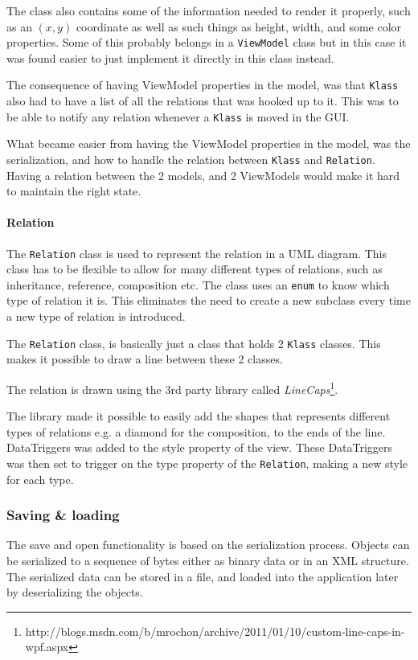 The class also contains some of the information needed to render it properly, such as
an $(x, y)$ coordinate as well as such things as height, width, and some color
properties. Some of this probably belongs in a \texttt{ViewModel} class but in 
this case it was found easier to just implement it directly in this class instead.

The consequence of having ViewModel properties in the model, was that
\texttt{Klass} also had to have a list of all the relations that was hooked up
to it. This was to be able to notify any relation whenever a \texttt{Klass} is
moved in the GUI. 

What became easier from having the ViewModel properties in the model, was the
serialization, and how to handle the relation between \texttt{Klass} and
\texttt{Relation}. Having a relation between the 2 models, and 2 ViewModels
would make it hard to maintain the right state.

\paragraph{Relation}
The \texttt{Relation} class is used to represent the relation in a UML diagram.
This class has to be flexible to allow for many different types of relations,
such as inheritance, reference, composition etc. The class uses an \texttt{enum} to
know
which type of relation it is. This eliminates the need to create a new subclass
every time a new type of relation is introduced.

The \texttt{Relation} class, is basically just a class that holds 2
\texttt{Klass} classes. This makes it possible to draw a line between these 2
classes.

The relation is drawn using the 3rd party library called
\textit{LineCaps}\footnote{http://blogs.msdn.com/b/mrochon/archive/2011/01/10/custom-line-caps-in-wpf.aspx}.

The library made it possible to easily add the shapes that represents different
types of relations e.g. a diamond for the composition, to the ends of the line.
DataTriggers was added to the style property of the view. These DataTriggers was
then set to trigger on the type property of the \texttt{Relation}, making a new
style for each type.

\subsubsection{Saving \& loading}
The save and open functionality is based on the serialization process. Objects
can be serialized to a sequence of bytes either as binary data or in an XML
structure. The serialized data can be stored in a file, and loaded into the
application later by deserializing the objects.

